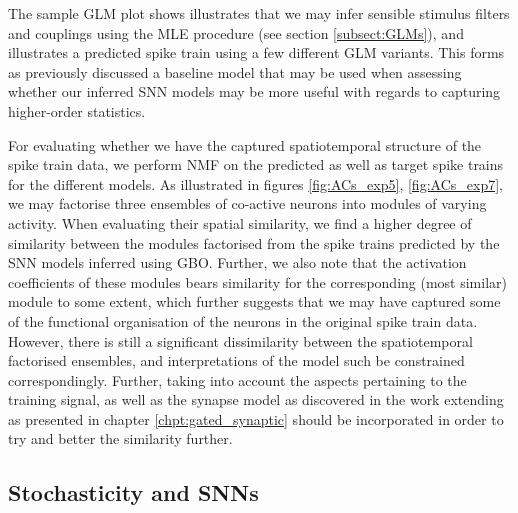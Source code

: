\documentclass[mphil,deptreport,ianc]{infthesis} %
\begin{document}
The sample GLM plot shows illustrates that we may infer sensible stimulus filters and couplings using the MLE procedure (see section \ref{subsect:GLMs}), and illustrates a predicted spike train using a few different GLM variants.
This forms as previously discussed a baseline model that may be used when assessing whether our inferred SNN models may be more useful with regards to capturing higher-order statistics.

For evaluating whether we have the captured spatiotemporal structure of the spike train data, we perform NMF on the predicted as well as target spike trains for the different models.
As illustrated in figures \ref{fig:ACs_exp5}, \ref{fig:ACs_exp7}, we may factorise three ensembles of co-active neurons into modules of varying activity.
When evaluating their spatial similarity, we find a higher degree of similarity between the modules factorised from the spike trains predicted by the SNN models inferred using GBO.
Further, we also note that the activation coefficients of these modules bears similarity for the corresponding (most similar) module to some extent, which further suggests that we may have captured some of the functional organisation of the neurons in the original spike train data.
However, there is still a significant dissimilarity between the spatiotemporal factorised ensembles, and interpretations of the model such be constrained correspondingly.
Further, taking into account the aspects pertaining to the training signal, as well as the synapse model as discovered in the work extending \cite{Huh2018} as presented in chapter \ref{chpt:gated_synaptic} should be incorporated in order to try and better the similarity further.


\subsection*{Stochasticity and SNNs}
\end{document}

